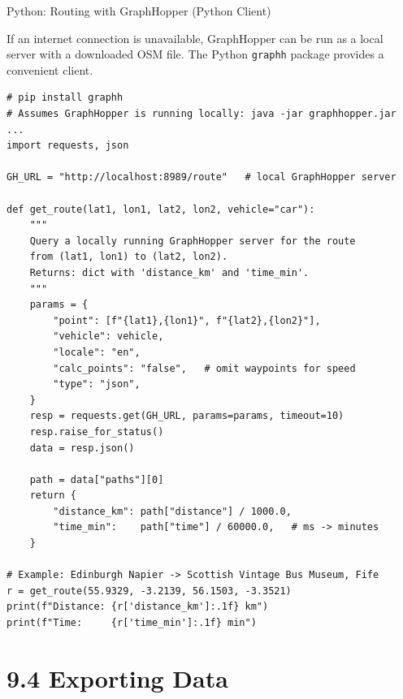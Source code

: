 \documentclass[aspectratio=169,10pt]{beamer}
\begin{document}
\begin{frame}[fragile]{Python: Routing with GraphHopper (Python Client)}

  If an internet connection is unavailable, GraphHopper can be run as a
  local server with a downloaded OSM file.  The Python \texttt{graphh}
  package provides a convenient client.

\begin{lstlisting}[style=pycode, caption={Single route query with GraphHopper local server}]
# pip install graphh
# Assumes GraphHopper is running locally: java -jar graphhopper.jar ...
import requests, json

GH_URL = "http://localhost:8989/route"   # local GraphHopper server

def get_route(lat1, lon1, lat2, lon2, vehicle="car"):
    """
    Query a locally running GraphHopper server for the route
    from (lat1, lon1) to (lat2, lon2).
    Returns: dict with 'distance_km' and 'time_min'.
    """
    params = {
        "point": [f"{lat1},{lon1}", f"{lat2},{lon2}"],
        "vehicle": vehicle,
        "locale": "en",
        "calc_points": "false",   # omit waypoints for speed
        "type": "json",
    }
    resp = requests.get(GH_URL, params=params, timeout=10)
    resp.raise_for_status()
    data = resp.json()

    path = data["paths"][0]
    return {
        "distance_km": path["distance"] / 1000.0,
        "time_min":    path["time"] / 60000.0,   # ms -> minutes
    }

# Example: Edinburgh Napier -> Scottish Vintage Bus Museum, Fife
r = get_route(55.9329, -3.2139, 56.1503, -3.3521)
print(f"Distance: {r['distance_km']:.1f} km")
print(f"Time:     {r['time_min']:.1f} min")
\end{lstlisting}

\end{frame}

\section{9.4 Exporting Data}
\end{document}
